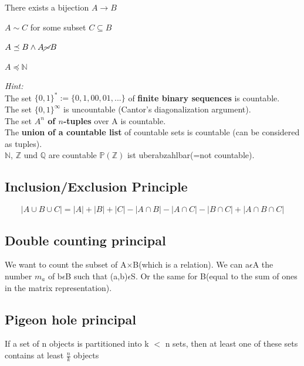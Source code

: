 \documentclass[11pt]{article}
\begin{document}
\begin{description}[labelindent=16pt,style=multiline,leftmargin=9cm, noitemsep]
	\item[same cardinality $A \sim B$:] There exists a bijection $A \rightarrow B$
	\item[B has at least the cardinality of A $A \preceq B$:] $A \sim C$ for some subset $C \subseteq B$
	\item[B dominates A $A \prec B$:] $A \preceq B \land A \cancel{\sim} B$
	\item[countable:] $A \preceq \mathbb{N}$
\end{description}

\emph{Hint:} \\
The set $\{0,1\}^* := \{0,1, 00, 01, ...\}$ of \textbf{finite binary sequences} is countable. \\
The set $\{0,1\}^\infty$ is uncountable (Cantor's diagonalization argument). \\
The set \textbf{$A^n$ of $n$-tuples} over A is countable. \\
The \textbf{union of a countable list} of countable sets is countable (can be considered as  tuples).\\
$\mathbb{N}$, $\mathbb{Z}$ und $\mathbb{Q}$ are countable $\mathbb{P}(\mathbb{Z})$ ist uberabzahlbar(=not countable).

\subsection{Inclusion/Exclusion Principle}

\begin{equation*}
	|A \cup B \cup C| = |A| + |B| + |C| - |A\cap B| - |A\cap C| - |B\cap C| + |A\cap B\cap C|
\end{equation*}

\subsection{Double counting principal}
We want to count the subset of A$\times$B(which is a relation). We can a$\epsilon$A the number $m_a$ of b$\epsilon$B such that (a,b)$\epsilon$S. Or the same for B(equal to the sum of ones in the matrix representation).

\subsection{Pigeon hole principal}
If a set of n objects is partitioned into k $<$ n sets, then at least one of these sets contains at least $\frac{n}{k}$ objects
\end{document}
